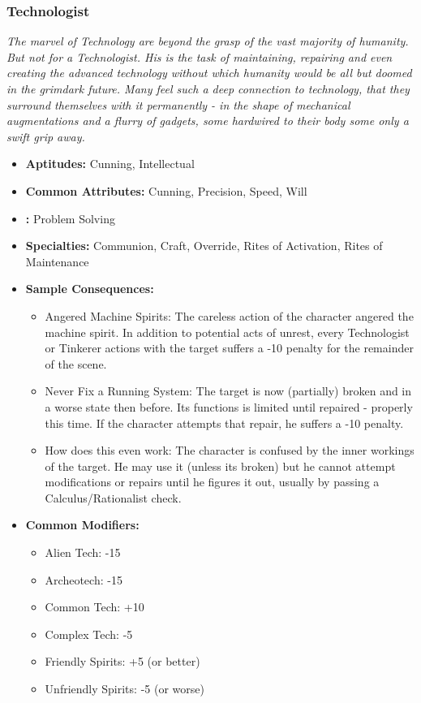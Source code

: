 	\subsubsection{Technologist}\label{Technologist}
		\textit{The marvel of Technology are beyond the grasp of the vast majority of humanity.
		But not for a Technologist.
		His is the task of maintaining, repairing and even creating the advanced technology without which humanity would be all but doomed in the grimdark future.
		Many feel such a deep connection to technology, that they surround themselves with it permanently - in the shape of mechanical augmentations and a flurry of gadgets, some hardwired to their body some only a swift grip away.}
		\begin{itemize}
			\item \textbf{Aptitudes:} Cunning, Intellectual
			\item \textbf{Common Attributes:} Cunning, Precision, Speed, Will 
			\item \textbf{:} Problem Solving
			\item \textbf{Specialties:} Communion, Craft, Override, Rites of Activation, Rites of Maintenance
			\item \textbf{Sample Consequences:} 
			\begin{itemize}
				\item Angered Machine Spirits: The careless action of the character angered the machine spirit. In addition to potential acts of unrest, every Technologist or Tinkerer actions with the target suffers a -10 penalty for the remainder of the scene.
				\item Never Fix a Running System: The target is now (partially) broken and in a worse state then before. Its functions is limited until repaired - properly this time. If the character attempts that repair, he suffers a -10 penalty.
				\item How does this even work: The character is confused by the inner workings of the target. He may use it (unless its broken) but he cannot attempt modifications or repairs until he figures it out, usually by passing a Calculus/Rationalist check.
			\end{itemize}
			\item \textbf{Common Modifiers:}
			\begin{itemize}
				\item Alien Tech: -15
				\item Archeotech: -15
				\item Common Tech: +10
				\item Complex Tech: -5
				\item Friendly Spirits: +5 (or better)
				\item Unfriendly Spirits: -5 (or worse)
			\end{itemize}
		\end{itemize}

